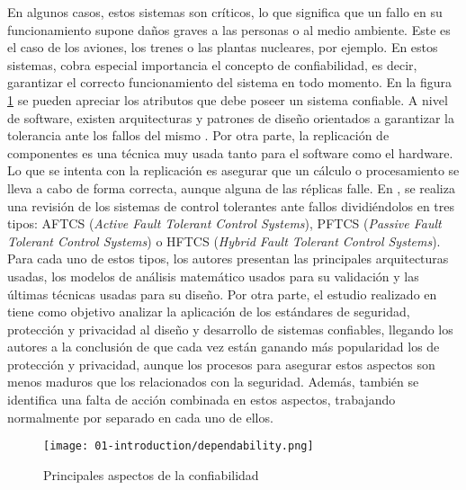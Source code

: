 En algunos casos, estos sistemas son críticos, lo que significa que un fallo en
su funcionamiento supone daños graves a las personas o al medio ambiente. Este
es el caso de los aviones, los trenes o las plantas nucleares, por ejemplo. En
estos sistemas, cobra especial importancia el concepto de confiabilidad, es
decir, garantizar el correcto funcionamiento del sistema en todo momento. En la
figura \ref{fig:01-dependability} se pueden apreciar los atributos que debe
poseer un sistema confiable. A nivel de software, existen arquitecturas y
patrones de diseño orientados a garantizar la tolerancia ante los fallos del
mismo \cite{pullum_software_2001}\cite{randell_system_1975}. Por otra parte, la
replicación de componentes \cite{hutchison_dependable_2006} es una técnica muy
usada tanto para el software como el hardware. Lo que se intenta con la
replicación es asegurar que un cálculo o procesamiento se lleva a cabo de forma
correcta, aunque alguna de las réplicas falle. En \cite{amin_review_2019}, se
realiza una revisión de los sistemas de control tolerantes ante fallos
dividiéndolos en tres tipos: AFTCS (\textit{Active Fault Tolerant Control
  Systems}), PFTCS (\textit{Passive Fault Tolerant Control Systems}) o HFTCS
(\textit{Hybrid Fault Tolerant Control Systems}). Para cada uno de estos tipos,
los autores presentan las principales arquitecturas usadas, los modelos de
análisis matemático usados para su validación y las últimas técnicas usadas para
su diseño. Por otra parte, el estudio realizado en \cite{shan_survey_2019} tiene
como objetivo analizar la aplicación de los estándares de seguridad, protección
y privacidad al diseño y desarrollo de sistemas confiables, llegando los autores
a la conclusión de que cada vez están ganando más popularidad los de protección
y privacidad, aunque los procesos para asegurar estos aspectos son menos maduros
que los relacionados con la seguridad. Además, también se identifica una falta
de acción combinada en estos aspectos, trabajando normalmente por separado en
cada uno de ellos.

\begin{figure}
  \centering
  \texttt{[image: 01-introduction/dependability.png]}
  \caption{Principales aspectos de la confiabilidad}
  \label{fig:01-dependability}
\end{figure}


